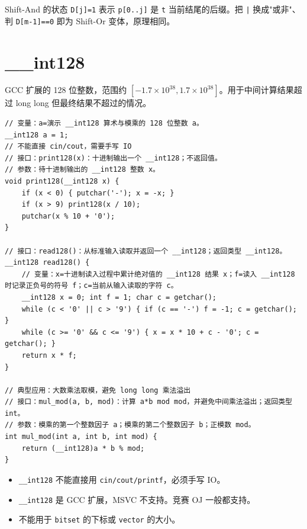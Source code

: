 \documentclass[UTF8,openany,oneside,zihao=-4]{ctexbook}
\begin{document}
\begin{tip}
Shift-And 的状态 \lstinline|D[j]=1| 表示 \lstinline|p[0..j]| 是 \lstinline|t| 当前结尾的后缀。把 \lstinline{|} 换成"或非"、判 \lstinline|D[m-1]==0| 即为 Shift-Or 变体，原理相同。
\end{tip}

\section{\_\_int128}

\begin{note}
GCC 扩展的 128 位整数，范围约 $[-1.7 \times 10^{38}, 1.7 \times 10^{38}]$。用于中间计算结果超过 long long 但最终结果不超过的情况。
\end{note}

\begin{lstlisting}
// 变量：a=演示 __int128 算术与模乘的 128 位整数 a。
__int128 a = 1;
// 不能直接 cin/cout，需要手写 IO
// 接口：print128(x)：十进制输出一个 __int128；不返回值。
// 参数：待十进制输出的 __int128 整数 x。
void print128(__int128 x) {
    if (x < 0) { putchar('-'); x = -x; }
    if (x > 9) print128(x / 10);
    putchar(x % 10 + '0');
}

// 接口：read128()：从标准输入读取并返回一个 __int128；返回类型 __int128。
__int128 read128() {
    // 变量：x=十进制读入过程中累计绝对值的 __int128 结果 x；f=读入 __int128 时记录正负号的符号 f；c=当前从输入读取的字符 c。
    __int128 x = 0; int f = 1; char c = getchar();
    while (c < '0' || c > '9') { if (c == '-') f = -1; c = getchar(); }
    while (c >= '0' && c <= '9') { x = x * 10 + c - '0'; c = getchar(); }
    return x * f;
}

// 典型应用：大数乘法取模，避免 long long 乘法溢出
// 接口：mul_mod(a, b, mod)：计算 a*b mod mod，并避免中间乘法溢出；返回类型 int。
// 参数：模乘的第一个整数因子 a；模乘的第二个整数因子 b；正模数 mod。
int mul_mod(int a, int b, int mod) {
    return (__int128)a * b % mod;
}
\end{lstlisting}

\begin{warn}
\begin{itemize}
  \item \lstinline|__int128| 不能直接用 \lstinline|cin/cout/printf|，必须手写 IO。
  \item \lstinline|__int128| 是 GCC 扩展，MSVC 不支持。竞赛 OJ 一般都支持。
  \item 不能用于 \lstinline|bitset| 的下标或 \lstinline|vector| 的大小。
\end{itemize}
\end{warn}
\end{document}
